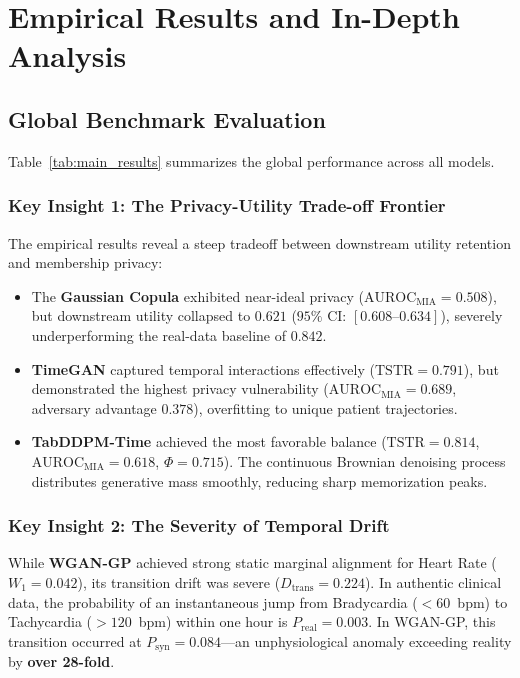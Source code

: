 \documentclass[journal]{IEEEtran}
\begin{document}
\section{Empirical Results and In-Depth Analysis}

\subsection{Global Benchmark Evaluation}
Table~\ref{tab:main_results} summarizes the global performance across all models.

\subsubsection{Key Insight 1: The Privacy-Utility Trade-off Frontier}
The empirical results reveal a steep tradeoff between downstream utility retention and membership privacy:
\begin{itemize}
    \item The \textbf{Gaussian Copula} exhibited near-ideal privacy ($\text{AUROC}_{\text{MIA}} = 0.508$), but downstream utility collapsed to $0.621$ ($95\%$ CI: $[0.608\text{--}0.634]$), severely underperforming the real-data baseline of $0.842$.
    \item \textbf{TimeGAN} captured temporal interactions effectively ($\text{TSTR} = 0.791$), but demonstrated the highest privacy vulnerability ($\text{AUROC}_{\text{MIA}} = 0.689$, adversary advantage $0.378$), overfitting to unique patient trajectories.
    \item \textbf{TabDDPM-Time} achieved the most favorable balance ($\text{TSTR} = 0.814$, $\text{AUROC}_{\text{MIA}} = 0.618$, $\Phi = 0.715$). The continuous Brownian denoising process distributes generative mass smoothly, reducing sharp memorization peaks.
\end{itemize}

\subsubsection{Key Insight 2: The Severity of Temporal Drift}
While \textbf{WGAN-GP} achieved strong static marginal alignment for Heart Rate ($W_1 = 0.042$), its transition drift was severe ($D_{\text{trans}} = 0.224$). In authentic clinical data, the probability of an instantaneous jump from Bradycardia ($<60$~bpm) to Tachycardia ($>120$~bpm) within one hour is $P_{\text{real}} = 0.003$. In WGAN-GP, this transition occurred at $P_{\text{syn}} = 0.084$---an unphysiological anomaly exceeding reality by \textbf{over 28-fold}.
\end{document}
